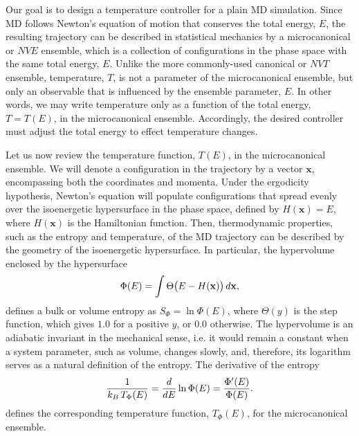 \documentclass[reprint]{revtex4-1}
\begin{document}
Our goal is to design a temperature controller for a plain MD simulation.
%
Since MD follows Newton's equation of motion
that conserves the total energy, $E$,
the resulting trajectory can be described in statistical mechanics
by a microcanonical or $NVE$ ensemble,
which is a collection of configurations in the phase space
with the same total energy, $E$.
%
Unlike the more commonly-used canonical or $NVT$ ensemble,
temperature, $T$, is not a parameter of the microcanonical ensemble,
but only an observable
that is influenced by the ensemble parameter, $E$.
%
In other words,
we may write temperature
only as a function of the total energy, $T = T(E)$,
in the microcanonical ensemble.
%
Accordingly, the desired controller must adjust the total energy
to effect temperature changes.


Let us now review the temperature function, $T(E)$,
in the microcanonical ensemble.
%
We will denote a configuration in the trajectory
by a vector $\mathbf x$,
encompassing both the coordinates and momenta.
%
Under the ergodicity hypothesis,
Newton's equation will populate configurations
that spread evenly over
the isoenergetic hypersurface in the phase space,
defined by
$H(\mathbf x) = E$,
where $H(\mathbf x)$ is the Hamiltonian function.
%
Then, thermodynamic properties, such as the entropy and temperature,
of the MD trajectory
can be described by the geometry of the isoenergetic hypersurface.
%
In particular, the hypervolume enclosed by the hypersurface
%
\begin{equation}
  \Phi(E)
  =
  \int
    \Theta\bigl( E - H(\mathbf x) \bigr)
    \, d\mathbf x
  ,
  \notag
\end{equation}
%
defines a bulk or volume entropy\cite{
  cagin1988, haile, dunkel2014}
as $S_\Phi = \ln \Phi(E)$,
where $\Theta(y)$ is the step function,
which gives $1.0$ for a positive $y$, or $0.0$ otherwise.
%
The hypervolume is
an adiabatic invariant\cite{
  gibbs, hertz1910a, hertz1910b, munster, becker,
  cagin1988, rugh2001, adib2002, dunkel2014}
in the mechanical sense,
i.e. it would remain a constant
when a system parameter, such as volume,
changes slowly,
and, therefore, its logarithm serves as
a natural definition of the entropy.
%
The derivative of the entropy
%
\begin{equation}
  \frac{1}{ k_B \, T_\Phi(E) }
  =
  \frac{ d }{ dE }
  \ln \Phi(E)
  =
  \frac{ \Phi'(E) }
       { \Phi(E)  }
  .
  \notag
\end{equation}
%
defines the corresponding temperature function, $T_\Phi(E)$,
for the microcanonical ensemble.
\end{document}
